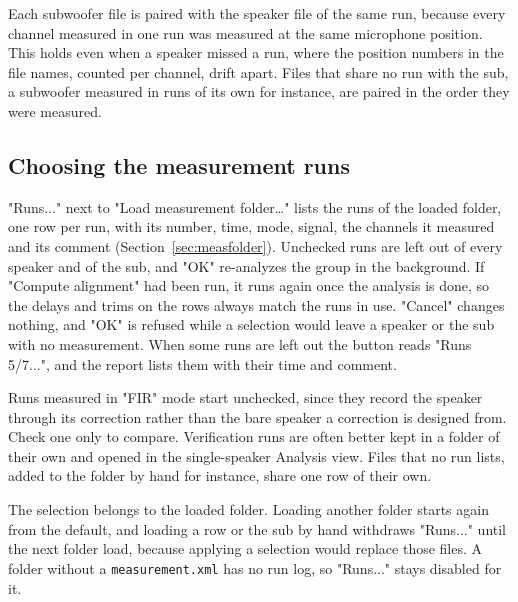 Each subwoofer file is paired with the speaker file of the same run, because every channel measured in one run was measured at the same microphone position. This holds even when a speaker missed a run, where the position numbers in the file names, counted per channel, drift apart. Files that share no run with the sub, a subwoofer measured in runs of its own for instance, are paired in the order they were measured.

\subsection{Choosing the measurement runs}\label{sec:groupruns}
"Runs..." next to "Load measurement folder\ldots" lists the runs of the loaded folder, one row per run, with its number, time, mode, signal, the channels it measured and its comment (Section~\ref{sec:measfolder}). Unchecked runs are left out of every speaker and of the sub, and "OK" re-analyzes the group in the background. If "Compute alignment" had been run, it runs again once the analysis is done, so the delays and trims on the rows always match the runs in use. "Cancel" changes nothing, and "OK" is refused while a selection would leave a speaker or the sub with no measurement. When some runs are left out the button reads "Runs 5/7...", and the report lists them with their time and comment.

Runs measured in "FIR" mode start unchecked, since they record the speaker through its correction rather than the bare speaker a correction is designed from. Check one only to compare. Verification runs are often better kept in a folder of their own and opened in the single-speaker Analysis view. Files that no run lists, added to the folder by hand for instance, share one row of their own.

The selection belongs to the loaded folder. Loading another folder starts again from the default, and loading a row or the sub by hand withdraws "Runs..." until the next folder load, because applying a selection would replace those files. A folder without a \texttt{measurement.xml} has no run log, so "Runs..." stays disabled for it.

